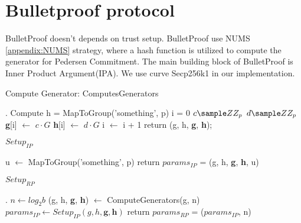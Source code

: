 \appendix


\section{Bulletproof protocol}
\label{appendix:bp}

BulletProof doesn't depends on trust setup. BulletProof use NUMS \ref{appendix:NUMS} strategy, where a hash function is utilized to compute the generator for Pedersen Commitment. The main building block of BulletProof is Inner Product Argument(IPA). We use curve Secp256k1 in our implementation.


\begin{algorithm}
 \DontPrintSemicolon
    \caption{Compute Generator: ComputesGenerators}
    \label{alg:ComputesGenerators}
    \LinesNumbered
    
    .
    Compute h = MapToGroup('something', p) \;
    i = 0 \;
     {
        $c \sample ZZ_p$ \;
        $d \sample ZZ_p$ \;
        \textbf{g}[i] $\gets$ $c\cdot G$ \;
        \textbf{h}[i] $\gets$ $d\cdot G$ \;
        i $\gets$ i + 1\;
    }
    return (g, h, \textbf{g}, \textbf{h});
\end{algorithm}

\begin{algorithm}
 \DontPrintSemicolon
    \caption{$Setup_{IP}$}
    \label{alg:setup_ip}
    \LinesNumbered
    
    
    u $\gets$  MapToGroup('something', p) \;
    return $params_{IP}$ = (g, h, \textbf{g}, \textbf{h}, u)
\end{algorithm}

\begin{algorithm}
 \DontPrintSemicolon
    \caption{$Setup_{RP}$}
    \label{alg:setup_rp}
    \LinesNumbered
    
    \KwIn{the input interval [a, b), and the field modulus p}.
     {
        $n \gets log_2b$ \;
        (g, h, \textbf{g}, \textbf{h}) $\gets$ ComputeGenerators(g, n) \;
        $params_{IP} \gets Setup_{IP}(g, h, \textbf{g}, \textbf{h})$ \;
        return $params_{RP}$ = ($params_{IP}$, n) \;
    }
\end{algorithm}

